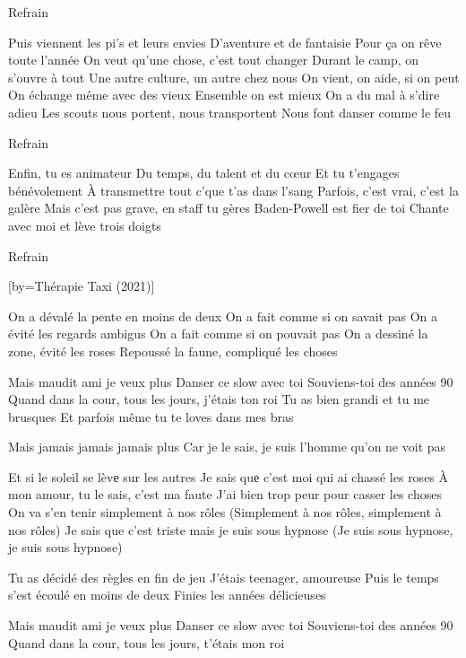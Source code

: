 \beginverse
Refrain
\\[bis]
\endverse

\beginverse
Puis viennent les pi's et leurs envies
D'aventure et de fantaisie
Pour ça on rêve toute l'année
On veut qu'une chose, c'est tout changer
Durant le camp, on s'ouvre à tout
Une autre culture, un autre chez nous
On vient, on aide, si on peut
On échange même avec des vieux
Ensemble on est mieux
On a du mal à s'dire adieu
Les scouts nous portent, nous transportent
Nous font danser comme le feu
\endverse

\beginverse
Refrain
\\[bis]
\endverse

\beginverse
Enfin, tu es animateur
Du temps, du talent et du cœur
Et tu t'engages bénévolement
À transmettre tout c'que t'as dans l'sang
Parfois, c'est vrai, c'est la galère
Mais c'est pas grave, en staff tu gères
Baden-Powell est fier de toi
Chante avec moi et lève trois doigts
\endverse

\beginverse
Refrain
\\[bis]
\endverse

[by={Thérapie Taxi (2021)}]

\beginverse
On a dévalé la pente en moins de deux
On a fait comme si on savait pas
On a évité les regards ambigus
On a fait comme si on pouvait pas
On a dessiné la zone, évité les roses
Repoussé la faune, compliqué les choses
\endverse

\beginverse
Mais maudit ami je veux plus
Danser ce slow avec toi
Souviens-toi des années 90
Quand dans la cour, tous les jours, j’étais ton roi
Tu as bien grandi et tu me brusques
Et parfois même tu te loves dans mes bras
\endverse

\beginverse
Mais jamais jamais jamais plus
Car je le sais, je suis l’homme qu’on ne voit pas
\endverse

\beginverse
Et si le soleil se lèvе sur les autres
Je sais quе c’est moi qui ai chassé les roses
À mon amour, tu le sais, c’est ma faute
J’ai bien trop peur pour casser les choses
On va s’en tenir simplement à nos rôles
(Simplement à nos rôles, simplement à nos rôles)
Je sais que c’est triste mais je suis sous hypnose
(Je suis sous hypnose, je suis sous hypnose)
\endverse

\beginverse
Tu as décidé des règles en fin de jeu
J’étais teenager, amoureuse
Puis le temps s’est écoulé en moins de deux
Finies les années délicieuses
\endverse

\beginverse
Mais maudit ami je veux plus
Danser ce slow avec toi
Souviens-toi des années 90
Quand dans la cour, tous les jours, t’étais mon roi
\endverse

